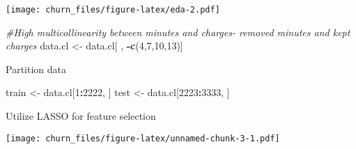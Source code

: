 \documentclass[]{article}
\newenvironment{Shaded}{\begin{snugshade}}{\end{snugshade}}
\newcommand{\KeywordTok}[1]{\textcolor[rgb]{0.13,0.29,0.53}{\textbf{#1}}}
\newcommand{\DataTypeTok}[1]{\textcolor[rgb]{0.13,0.29,0.53}{#1}}
\newcommand{\DecValTok}[1]{\textcolor[rgb]{0.00,0.00,0.81}{#1}}
\newcommand{\StringTok}[1]{\textcolor[rgb]{0.31,0.60,0.02}{#1}}
\newcommand{\CommentTok}[1]{\textcolor[rgb]{0.56,0.35,0.01}{\textit{#1}}}
\newcommand{\OperatorTok}[1]{\textcolor[rgb]{0.81,0.36,0.00}{\textbf{#1}}}
\newcommand{\NormalTok}[1]{#1}
\begin{document}
\texttt{[image: churn\_files/figure-latex/eda-2.pdf]}

\begin{Shaded}
\begin{Highlighting}[]
\CommentTok{#High multicollinearity between minutes and charges- removed minutes and kept charges}
\NormalTok{data.cl <-}\StringTok{ }\NormalTok{data.cl[ , }\OperatorTok{-}\KeywordTok{c}\NormalTok{(}\DecValTok{4}\NormalTok{,}\DecValTok{7}\NormalTok{,}\DecValTok{10}\NormalTok{,}\DecValTok{13}\NormalTok{)]}
\end{Highlighting}
\end{Shaded}

Partition data

\begin{Shaded}
\begin{Highlighting}[]
\NormalTok{train <-}\StringTok{ }\NormalTok{data.cl[}\DecValTok{1}\OperatorTok{:}\DecValTok{2222}\NormalTok{, ]}
\NormalTok{test <-}\StringTok{ }\NormalTok{data.cl[}\DecValTok{2223}\OperatorTok{:}\DecValTok{3333}\NormalTok{, ]}
\end{Highlighting}
\end{Shaded}

Utilize LASSO for feature selection

\begin{Shaded}
\end{Shaded}

\texttt{[image: churn\_files/figure-latex/unnamed-chunk-3-1.pdf]}
\end{document}
